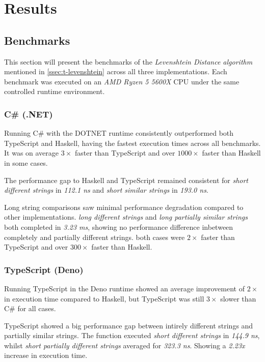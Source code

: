 \section{Results}
\subsection{Benchmarks}
\label{ssec:r-benchmark}

This section will present the benchmarks of the \textit{Levenshtein Distance algorithm}
mentioned in \autoref{ssec:t-levenshtein} across all three implementations.
Each benchmark was executed on an \textit{AMD Ryzen 5 5600X} CPU under the same controlled
runtime environment.

\subsubsection{C\# (.NET)}
Running C\# with the DOTNET runtime consistently outperformed both TypeScript and Haskell,
having the fastest execution times across all benchmarks.
It was on average $3 \times$ faster than TypeScript and over
$1000 \times$ faster than Haskell in some cases.

The performance gap to Haskell and TypeScript remained consistent for
\textit{short different strings} in \textit{112.1 ns} and
\textit{short similar strings} in \textit{193.0 ns}.

Long string comparisons saw minimal performance degradation compared to other implementations.
\textit{long different strings} and \textit{long partially similar strings} both completed in
\textit{3.23 ms}, showing no performance difference inbetween completely and partially different strings.
both cases were $2 \times$ faster than TypeScript and over $300 \times$ faster than Haskell.

\subsubsection{TypeScript (Deno)}
Running TypeScript in the Deno runtime showed an average improvement of $2 \times$ in execution
time compared to Haskell, but TypeScript was still $3 \times$ slower than C\# for all cases.

TypeScript showed a big performance gap between intirely different strings and partially similar strings.
The function executed \textit{short different strings} in \textit{144.9 ns},
whilst \textit{short partially different strings} averaged for \textit{323.3 ns}. Showing a
\textit{2.23x} increase in execution time.

